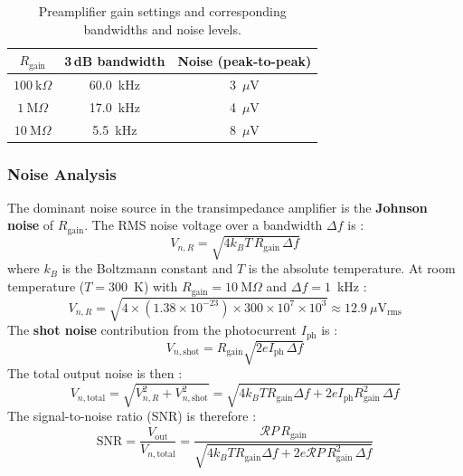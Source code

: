 \begin{table}[h]
    \centering
    \begin{tabular}{ccc}
        \hline
        $R_{\text{gain}}$ & 3\,dB bandwidth & Noise (peak-to-peak) \\
        \hline
        $100\ \text{k}\Omega$ & 60.0~kHz & 3~$\mu$V \\
        $1\ \text{M}\Omega$   & 17.0~kHz & 4~$\mu$V \\
        $10\ \text{M}\Omega$  &  5.5~kHz & 8~$\mu$V \\
        \hline
    \end{tabular}
    \caption{Preamplifier gain settings and corresponding bandwidths and noise levels.}
\end{table}

\subsubsection*{Noise Analysis}

The dominant noise source in the transimpedance amplifier is the \textbf{Johnson noise}
of $R_{\text{gain}}$. The RMS noise voltage over a bandwidth $\Delta f$ is :
\begin{equation}
    V_{n,R} = \sqrt{4k_BT\,R_{\text{gain}}\,\Delta f}
\end{equation}
where $k_B$ is the Boltzmann constant and $T$ is the absolute temperature. At room
temperature ($T = 300$~K) with $R_{\text{gain}} = 10\ \text{M}\Omega$ and
$\Delta f = 1$~kHz :
\begin{equation}
    V_{n,R} = \sqrt{4\times(1.38\times10^{-23})\times300\times10^7\times10^3}
    \approx 12.9\ \mu\text{V}_{\text{rms}}
\end{equation}
The \textbf{shot noise} contribution from the photocurrent $I_{\text{ph}}$ is :
\begin{equation}
    V_{n,\text{shot}} = R_{\text{gain}}\sqrt{2eI_{\text{ph}}\,\Delta f}
\end{equation}
The total output noise is then :
\begin{equation}
    V_{n,\text{total}} = \sqrt{V_{n,R}^2 + V_{n,\text{shot}}^2}
                       = \sqrt{4k_BT R_{\text{gain}}\Delta f
                              + 2eI_{\text{ph}}R_{\text{gain}}^2\,\Delta f}
\end{equation}
The signal-to-noise ratio (SNR) is therefore :
\begin{equation}
    \text{SNR} = \frac{V_{\text{out}}}{V_{n,\text{total}}}
               = \frac{\mathcal{R}P\,R_{\text{gain}}}
                      {\sqrt{4k_BT R_{\text{gain}}\Delta f
                             + 2e\mathcal{R}P\,R_{\text{gain}}^2\,\Delta f}}
\end{equation}

